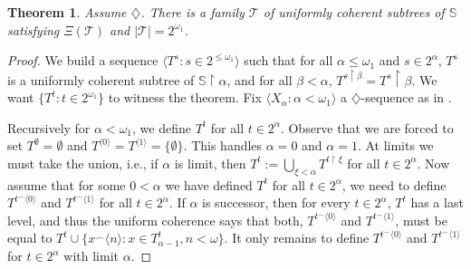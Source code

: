\documentclass[a4paper,noamsfonts]{amsart}
\newtheorem{theorem}{Theorem}[section]
\theoremstyle{definition}
\newcommand{\es}{\emptyset}
\newcommand{\res}{\!\upharpoonright\!}
\newcommand{\tup}[1]{\langle#1\rangle}
\newcommand{\1}{\mathbf{1}}
\newcommand{\dia}{\diamondsuit}
\newcommand{\T}{\mathcal{T}}
\newcommand{\prop}{\Xi}
\renewcommand{\S}{\mathbb{S}}
\begin{document}
\begin{theorem}\label{thm:existence}
  Assume $\dia$. There is a family $\T$ of uniformly coherent
  subtrees of $\S$ satisfying $\prop(\T)$ and $|\T| = 2^{\omega_{1}}$.
\end{theorem}
\begin{proof}
  We build a sequence $\tup{T^{s} : s \in 2^{\le\omega_{1}}}$
  such that for all $\alpha \le \omega_{1}$ and $s \in 2^{\alpha}$,
  $T^{s}$ is a uniformly coherent subtree of $\S \res \alpha$,
  and for all $\beta < \alpha$, $T^{s\res\beta} = T^{s}\res\beta$.
  We want $\{T^{t} : t \in 2^{\omega_{1}}\}$ to witness the theorem.
  Fix $\tup{X_{\alpha} : \alpha < \omega_{1}}$
  a $\dia$-sequence as in .

  Recursively for $\alpha < \omega_{1}$, we define
  $T^{t}$ for all $t \in 2^{\alpha}$. Observe that we are forced
  to set $T^{\es} = \es$ and $T^{\tup{0}} = T^{\tup{1}} = \{\es\}$. This handles
  $\alpha = 0$ and $\alpha = 1$. At
  limits we must take the union, i.e., if $\alpha$ is limit, then
  $T^{t} := \bigcup_{\xi < \alpha}T^{t\res \xi}$ for all $t \in 2^{\alpha}$.
  Now assume that for some $0 < \alpha$
  we have defined $T^{t}$ for all $t \in 2^{\alpha}$, we need to define
  $T^{t^{\frown}\tup{0}}$ and $T^{t^{\frown}\tup{1}}$ for all $t \in 2^{\alpha}$.
  If $\alpha$ is successor, then for every $t \in 2^{\alpha}$,
  $T^{t}$ has a last level, and thus the uniform coherence
  says that both, $T^{t^{\frown}\tup{0}}$ and $T^{t^{\frown}\tup{1}}$,
  must be equal to $T^{t} \cup
  \{x^{\frown}\tup{n} : x \in T^{t}_{\alpha-1}, n < \omega\}$.
  It only remains to define
  $T^{t^{\frown}\tup{0}}$ and $T^{t^{\frown}\tup{1}}$
  for $t \in 2^{\alpha}$ with limit $\alpha$.


\end{proof}
\end{document}

